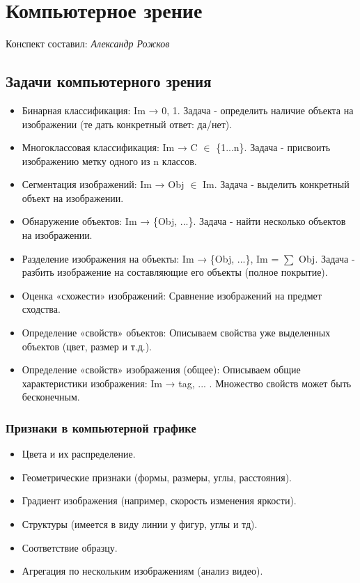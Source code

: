 \section{Компьютерное зрение}
\begin{center}
    Конспект составил: \textit{Александр Рожков}
\end{center}

\subsection{Задачи компьютерного зрения}
\begin{itemize}
    \item Бинарная классификация: Im → 0, 1. Задача - определить наличие объекта на изображении (те дать конкретный ответ: да/нет).
    \item Многоклассовая классификация: Im → C \(\in\) \{1...n\}. Задача - присвоить изображению метку одного из n классов.
    \item Сегментация изображений: Im → Obj \(\in\) Im. Задача - выделить конкретный объект на изображении.
    \item Обнаружение объектов: Im → \{Obj, ...\}. Задача - найти несколько объектов на изображении.
    \item Разделение изображения на объекты: Im → \{Obj, ...\}, Im = \(\sum\) Obj. Задача - разбить изображение на составляющие его объекты (полное покрытие).
    \item Оценка «схожести» изображений: Сравнение изображений на предмет сходства.
    \item Определение «свойств» объектов: Описываем свойства уже выделенных объектов (цвет, размер и т.д.).
    \item Определение «свойств» изображения (общее): Описываем общие характеристики изображения: Im → tag, ... . Множество свойств может быть бесконечным.
\end{itemize}
\subsubsection{Признаки в компьютерной графике}
\begin{itemize}
    \item Цвета и их распределение.
    \item Геометрические признаки (формы, размеры, углы, расстояния).
    \item Градиент изображения (например, скорость изменения яркости).
    \item Структуры (имеется в виду линии у фигур, углы и тд).
    \item Соответствие образцу.
    \item Агрегация по нескольким изображениям (анализ видео).
\end{itemize}
\newpage
